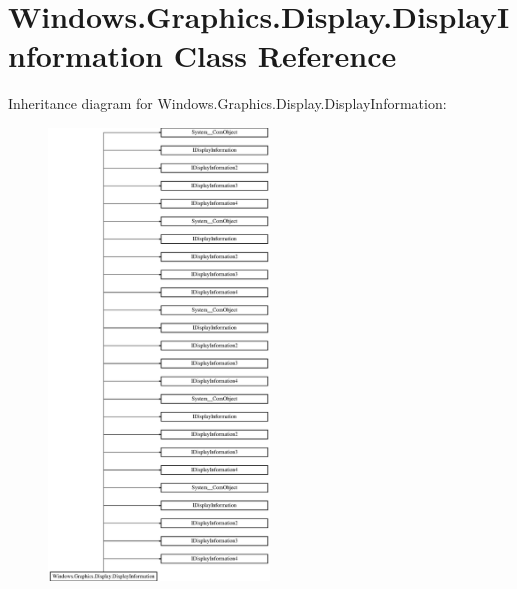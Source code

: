 \hypertarget{class_windows_1_1_graphics_1_1_display_1_1_display_information}{}\section{Windows.\+Graphics.\+Display.\+Display\+Information Class Reference}
\label{class_windows_1_1_graphics_1_1_display_1_1_display_information}
Inheritance diagram for Windows.\+Graphics.\+Display.\+Display\+Information\+:\begin{figure}[H]
\begin{center}
\leavevmode
\includegraphics[height=12.000000cm]{class_windows_1_1_graphics_1_1_display_1_1_display_information}
\end{center}
\end{figure}
